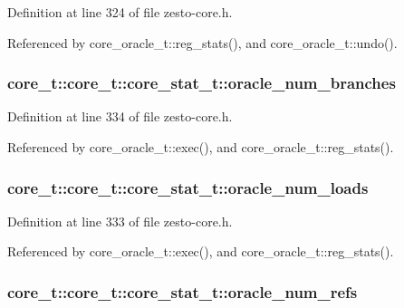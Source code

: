 Definition at line 324 of file zesto-core.h.

Referenced by core\_\-oracle\_\-t::reg\_\-stats(), and core\_\-oracle\_\-t::undo().
\subsubsection[{oracle\_\-num\_\-branches}]{ core\_\-t::core\_\-t::core\_\-stat\_\-t::oracle\_\-num\_\-branches}\label{structcore__t_1_1core__stat__t_41f068fd35eac1ec28b4fe69b88d1edd}




Definition at line 334 of file zesto-core.h.

Referenced by core\_\-oracle\_\-t::exec(), and core\_\-oracle\_\-t::reg\_\-stats().
\subsubsection[{oracle\_\-num\_\-loads}]{ core\_\-t::core\_\-t::core\_\-stat\_\-t::oracle\_\-num\_\-loads}\label{structcore__t_1_1core__stat__t_b0f22a4d1fc67a8007391bf9d139cbab}




Definition at line 333 of file zesto-core.h.

Referenced by core\_\-oracle\_\-t::exec(), and core\_\-oracle\_\-t::reg\_\-stats().
\subsubsection[{oracle\_\-num\_\-refs}]{ core\_\-t::core\_\-t::core\_\-stat\_\-t::oracle\_\-num\_\-refs}\label{structcore__t_1_1core__stat__t_9d38f70d7711758002a9f0a103dbddf0}




